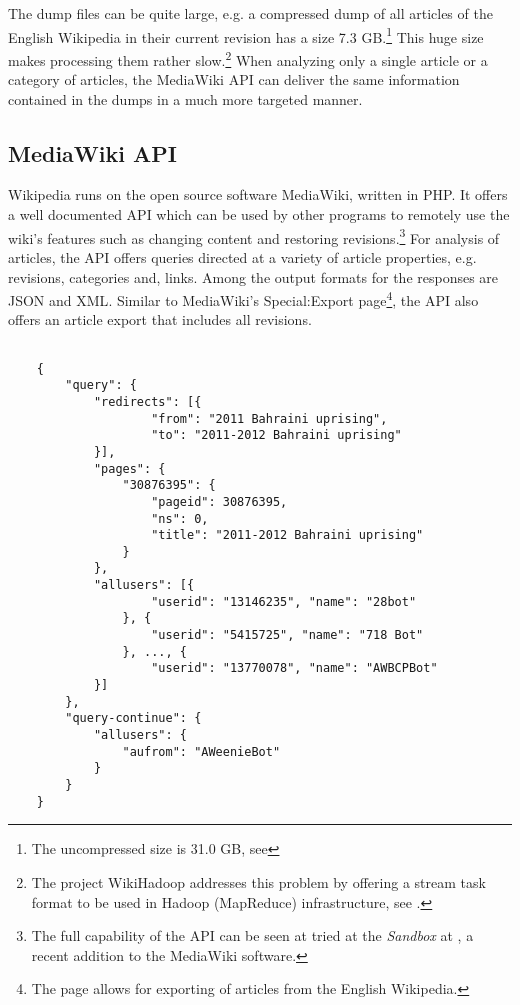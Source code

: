 The dump files can be quite large, e.g. a compressed dump of all articles of the English Wikipedia in their current revision has a size 7.3 GB.\footnote{The uncompressed size is 31.0 GB, see }
This huge size makes processing them rather slow.\footnote{The project WikiHadoop addresses this problem by offering a stream task format to be used in Hadoop (MapReduce) infrastructure, see .}
When analyzing only a single article or a category of articles, the MediaWiki \ac{API} can deliver the same information contained in the dumps in a much more targeted manner. 

\subsection{MediaWiki \ac{API}}\label{sub:mediawikiapi}

Wikipedia runs on the open source software MediaWiki, written in \ac{PHP}.
It offers a well documented \ac{API} which can be used by other programs to remotely use the wiki's features such as changing content and restoring revisions.\footnote{The full capability of the \ac{API} can be seen at tried at the \emph{Sandbox} at , a recent addition to the MediaWiki software.}
For analysis of articles, the \ac{API} offers queries directed at a variety of article properties, e.g. revisions, categories and, links.
Among the output formats for the responses are \ac{JSON} and \ac{XML}.
Similar to MediaWiki's Special:Export page\footnote{The page  allows for exporting of articles from the English Wikipedia.}, the \ac{API} also offers an article export that includes all revisions.
\begin{lstlisting}

	{
		"query": {
			"redirects": [{
					"from": "2011 Bahraini uprising",
					"to": "2011-2012 Bahraini uprising"
			}],
			"pages": {
				"30876395": {
					"pageid": 30876395,
					"ns": 0,
					"title": "2011-2012 Bahraini uprising"
				}
			},
			"allusers": [{
					"userid": "13146235", "name": "28bot"
				}, {
					"userid": "5415725", "name": "718 Bot"
				}, ..., {
					"userid": "13770078", "name": "AWBCPBot"
			}]
		},
		"query-continue": {
			"allusers": {
				"aufrom": "AWeenieBot"
			}
		}
	}
\end{lstlisting}

